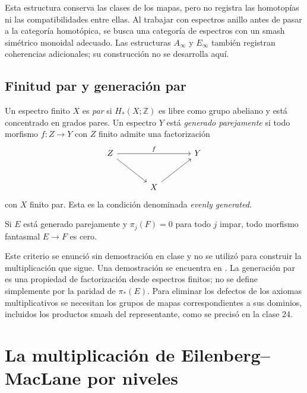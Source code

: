 Esta estructura conserva las clases de los mapas, pero no registra las homotopías ni las compatibilidades entre ellas. Al trabajar con espectros anillo antes de pasar a la categoría homotópica, se busca una categoría de espectros con un smash simétrico monoidal adecuado. Las estructuras $A_\infty$ y $E_\infty$ también registran coherencias adicionales; su construcción no se desarrolla aquí.

\subsection{Finitud par y generación par}
\begin{defi}
Un espectro finito $X$ es \emph{par} si $H_*(X;\mathbb Z)$ es libre como grupo abeliano y está concentrado en grados pares. Un espectro $Y$ está \emph{generado parejamente} si todo morfismo $f\colon Z\to Y$ con $Z$ finito admite una factorización
\[
\begin{tikzcd}[column sep=large,row sep=large]
Z\arrow[rr,"f"]\arrow[dr]&&Y\\
&X\arrow[ur]&
\end{tikzcd}
\]
con $X$ finito par. Esta es la condición denominada \emph{evenly generated}.
\end{defi}

\begin{teo}\label{teo:c25-anulacion-fantasmas}
Si $E$ está generado parejamente y $\pi_j(F)=0$ para todo $j$ impar, todo morfismo fantasmal $E\to F$ es cero.
\end{teo}
\begin{nota}
Este criterio se enunció sin demostración en clase y no se utilizó para construir la multiplicación que sigue. Una demostración se encuentra en \cite[lección~17, proposición~10]{lurie2010chromatic}. La generación par es una propiedad de factorización desde espectros finitos; no se define simplemente por la paridad de $\pi_*(E)$. Para eliminar los defectos de los axiomas multiplicativos se necesitan los grupos de mapas correspondientes a sus dominios, incluidos los productos smash del representante, como se precisó en la clase 24.
\end{nota}

\section{La multiplicación de Eilenberg--MacLane por niveles}

